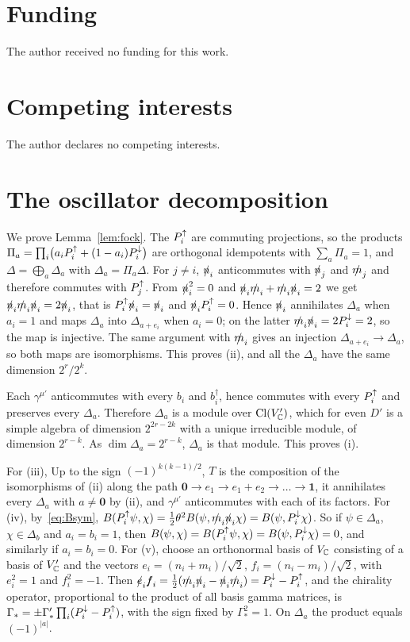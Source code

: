 \section*{Funding}

The author received no funding for this work.

\section*{Competing interests}

The author declares no competing interests.

\appendix

\section{The oscillator decomposition}
\label{app:fock}

We prove Lemma~\ref{lem:fock}. The $P^{\uparrow}_i$ are commuting projections, so the products $\Pi_a=\prod_i\bigl(a_iP^{\uparrow}_i+(1-a_i)P^{\downarrow}_i\bigr)$ are orthogonal idempotents with $\sum_a\Pi_a=1$, and $\Delta=\bigoplus_a\Delta_a$ with $\Delta_a=\Pi_a\Delta$. For $j\ne i$, $\slashed{n}_i$ anticommutes with $\slashed{n}_j$ and $\slashed{m}_j$ and therefore commutes with $P^{\uparrow}_j$. From $\slashed{n}_i^2=0$ and $\slashed{n}_i\slashed{m}_i+\slashed{m}_i\slashed{n}_i=2$ we get $\slashed{n}_i\slashed{m}_i\slashed{n}_i=2\slashed{n}_i$, that is $P^{\uparrow}_i\slashed{n}_i=\slashed{n}_i$ and $\slashed{n}_iP^{\uparrow}_i=0$. Hence $\slashed{n}_i$ annihilates $\Delta_a$ when $a_i=1$ and maps $\Delta_a$ into $\Delta_{a+e_i}$ when $a_i=0$; on the latter $\slashed{m}_i\slashed{n}_i=2P^{\downarrow}_i=2$, so the map is injective. The same argument with $\slashed{m}_i$ gives an injection $\Delta_{a+e_i}\to\Delta_a$, so both maps are isomorphisms. This proves (ii), and all the $\Delta_a$ have the same dimension $2^r/2^k$.

Each $\gamma^{\mu'}$ anticommutes with every $b_i$ and $b_i^\dagger$, hence commutes with every $P^{\uparrow}_i$ and preserves every $\Delta_a$. Therefore $\Delta_a$ is a module over $\operatorname{Cl}(V'_{\mathbb{C}})$, which for even $D'$ is a simple algebra of dimension $2^{2r-2k}$ with a unique irreducible module, of dimension $2^{r-k}$. As $\dim\Delta_a=2^{r-k}$, $\Delta_a$ is that module. This proves (i).

For (iii), Up to the sign $(-1)^{k(k-1)/2}$, $T$ is the composition of the isomorphisms of (ii) along the path $\mathbf 0\to e_1\to e_1+e_2\to\dots\to\mathbf 1$, it annihilates every $\Delta_a$ with $a\ne\mathbf 0$ by (ii), and $\gamma^{\mu'}$ anticommutes with each of its factors. For (iv), by~\eqref{eq:Bsym}, $B(P^{\uparrow}_i\psi,\chi)=\frac12\theta^2B(\psi,\slashed{m}_i\slashed{n}_i\chi)=B(\psi,P^{\downarrow}_i\chi)$. So if $\psi\in\Delta_a$, $\chi\in\Delta_b$ and $a_i=b_i=1$, then $B(\psi,\chi)=B(P^{\uparrow}_i\psi,\chi)=B(\psi,P^{\downarrow}_i\chi)=0$, and similarly if $a_i=b_i=0$. For (v), choose an orthonormal basis of $V_{\mathbb{C}}$ consisting of a basis of $V'_{\mathbb{C}}$ and the vectors $e_i=(n_i+m_i)/\sqrt2$, $f_i=(n_i-m_i)/\sqrt2$, with $e_i^2=1$ and $f_i^2=-1$. Then $\slashed e_i\slashed f_i=\frac12(\slashed{m}_i\slashed{n}_i-\slashed{n}_i\slashed{m}_i)=P^{\downarrow}_i-P^{\uparrow}_i$, and the chirality operator, proportional to the product of all basis gamma matrices, is $\Gamma_*=\pm\Gamma'_*\prod_i(P^{\downarrow}_i-P^{\uparrow}_i)$, with the sign fixed by $\Gamma_*^2=1$. On $\Delta_a$ the product equals $(-1)^{|a|}$.

